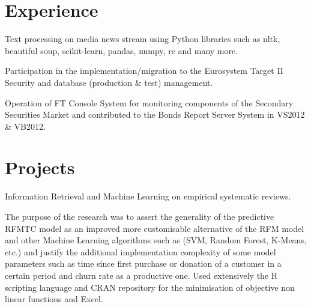 \documentclass[]{deedy-resume-openfont}
\begin{document}
\begin{minipage}[t]{0.33\textwidth}
%
%

\end{minipage} 
\hfill
\begin{minipage}[t]{0.66\textwidth} 


\section{Experience}

\vspace{\topsep} %
\begin{tightemize}\item Text processing on media news stream using Python libraries such as nltk, beautiful soup, scikit-learn, pandas, numpy, re and many more.
\end{tightemize}
\sectionsep

\begin{tightemize}
\item Participation in the implementation/migration to the Eurosystem Target II Security and database (production \& test) management.\item Operation of FT Console System for monitoring components of the Secondary Securities Market and contributed to the Bonds Report Server System in VS2012 \& VB2012. \end{tightemize}
\sectionsep


\section{Projects}
Information Retrieval and Machine Learning on empirical systematic reviews.
\sectionsep

The purpose of the research was to assert the generality of the predictive RFMTC model as an improved more customisable alternative of the RFM model and other Machine Learning algorithms such as (SVM, Random Forest, K-Means, etc.) and justify the additional implementation complexity of some model parameters such as time since first purchase or donation of a customer in a certain period and churn rate as a productive one. Used extensively the R scripting language and CRAN repository for the minimisation of objective non linear functions and Excel.
\sectionsep


\end{minipage}
\end{document}

